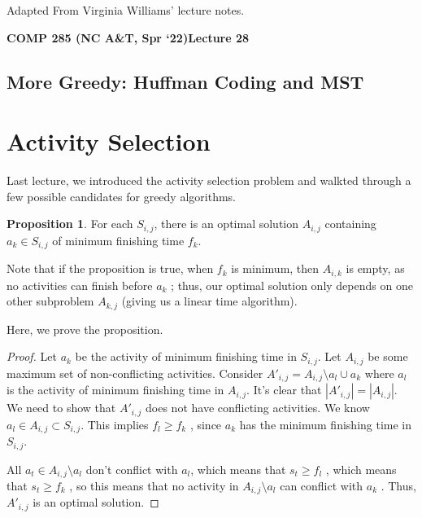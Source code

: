 \documentclass [12pt]{article}
\theoremstyle{definition}
\newtheorem{proposition}{Proposition}
\begin{document}
 

\vspace {1em} 
\begin {Instruction} 
Adapted From Virginia Williams' lecture notes.
\end {Instruction}  

{\LARGE \textbf {COMP 285 (NC A\&T, Spr `22)}\hfill \textbf {Lecture 28} } 

\begin{centering}
\section*{More Greedy: Huffman Coding and MST}
\end{centering}


\section{Activity Selection}

Last lecture, we introduced the activity selection problem and walkted through a few possible candidates for greedy algorithms. 

\begin{proposition}
For each $S_{i ,j}$, there is an optimal solution $A_{i ,j}$ containing $a_k \in S_{i ,j}$ of minimum finishing time $f_k$.
\end{proposition}
 

Note that if the proposition is true, when $f_k$ is minimum, then $A_{i ,k}$ is empty, as no activities can finish before $a_k$ ; thus, our optimal solution only depends on one other subproblem $A_{k ,j}$ (giving us a linear time algorithm). 


Here, we prove the proposition.

\begin{proof}

Let $a_k$ be the activity of minimum finishing time in $S_{i ,j}$. Let $A_{i ,j}$ be some maximum set of non-conflicting activities. Consider $A'_{i ,j} = A_{i ,j} \setminus {a_l} \cup {a_k}$ where $a_l$ is the activity of minimum finishing time in $A_{i ,j}$. It’s clear that $|A'_{i ,j}| = |A_{i ,j}|$. We need to show that $A'_{i ,j}$ does not have conflicting activities. We know $a_l \in A_{i ,j} \subset S_{i ,j}$. This implies $f_l \geq f_k$ , since $a_k$ has the minimum finishing time in $S_{i ,j}$. 

All $a_t \in A_{i ,j} \setminus {a_l}$ don’t conflict with $a_l $, which means that $s_t \geq f_l$ , which means that $s_t \geq f_k$ , so this means that no activity in $A_{i ,j} \setminus {a_l}$ can conflict with $a_k$ . Thus, $A'_{i ,j}$ is an optimal solution.
\end{proof}
\end{document}
